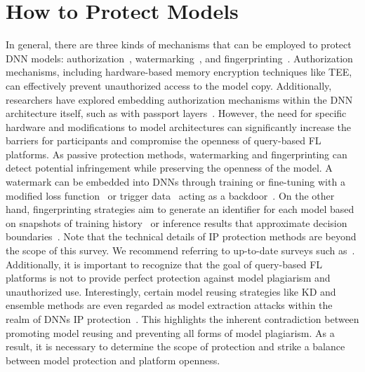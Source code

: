 \documentclass[journal]{IEEEtran}
\begin{document}
\section{How to Protect Models}
\label{apdx:how2protect}
In general, there are three kinds of mechanisms that can be employed to protect DNN models: authorization~\cite{hanzlik2021mlcapsule}, watermarking~\cite{tekgul2021waffle}, and fingerprinting~\cite{li2023fedipr}.
Authorization mechanisms, including hardware-based memory encryption techniques like TEE, can effectively prevent unauthorized access to the model copy.
Additionally, researchers have explored embedding authorization mechanisms within the DNN architecture itself, such as with passport layers~\cite{fan2019rethinking, zhang2020passport}.
However, the need for specific hardware and modifications to model architectures can significantly increase the barriers for participants and compromise the openness of query-based FL platforms.
As passive protection methods, watermarking and fingerprinting can detect potential infringement while preserving the openness of the model. 
A watermark can be embedded into DNNs through training or fine-tuning with a modified loss function~\cite{uchida2017embedding} or trigger data~\cite{darvish2019deepsigns} acting as a backdoor~\cite{bagdasaryan2020backdoor}.
On the other hand, fingerprinting strategies aim to generate an identifier for each model based on snapshots of training history~\cite{jia2021proof} or inference results that approximate decision boundaries~\cite{chen2022copy}.
Note that the technical details of IP protection methods are beyond the scope of this survey.
We recommend referring to up-to-date surveys such as~\cite{peng2022intellectual, sun2023deep}.
Additionally, it is important to recognize that the goal of query-based FL platforms is not to provide perfect protection against model plagiarism and unauthorized use.
Interestingly, certain model reusing strategies like KD and ensemble methods are even regarded as model extraction attacks within the realm of DNNs IP protection~\cite{charette2022cosine}.
This highlights the inherent contradiction between promoting model reusing and preventing all forms of model plagiarism.
As a result, it is necessary to determine the scope of protection and strike a balance between model protection and platform openness.
\end{document}
